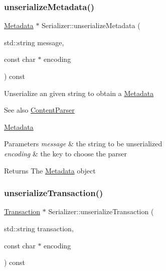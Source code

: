 \subsubsection{\texorpdfstring{unserialize\+Metadata()}{unserializeMetadata()}}
{\footnotesize\ttfamily \mbox{\hyperlink{classMetadata}{Metadata}} $\ast$ Serializer\+::unserialize\+Metadata (\begin{DoxyParamCaption}\item[{std\+::string}]{message,  }\item[{const char $\ast$}]{encoding }\end{DoxyParamCaption}) const\hspace{0.3cm}{\ttfamily [virtual]}}

Unserialize an given string to obtain a \mbox{\hyperlink{classMetadata}{Metadata}} \begin{DoxySeeAlso}{See also}
\mbox{\hyperlink{classContentParser}{Content\+Parser}} 

\mbox{\hyperlink{classMetadata}{Metadata}}
\end{DoxySeeAlso}

\begin{DoxyParams}{Parameters}
{\em message} & the string to be unserialized \\
\hline
{\em encoding} & the key to choose the parser \\
\hline
\end{DoxyParams}
\begin{DoxyReturn}{Returns}
The \mbox{\hyperlink{classMetadata}{Metadata}} object 
\end{DoxyReturn}
\mbox{\label{classSerializer_ab5fa979a8486be6f49ad10f4810509d7}} 
\subsubsection{\texorpdfstring{unserialize\+Transaction()}{unserializeTransaction()}}
{\footnotesize\ttfamily \mbox{\hyperlink{classTransaction}{Transaction}} $\ast$ Serializer\+::unserialize\+Transaction (\begin{DoxyParamCaption}\item[{std\+::string}]{transaction,  }\item[{const char $\ast$}]{encoding }\end{DoxyParamCaption}) const\hspace{0.3cm}{\ttfamily [virtual]}}

